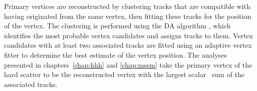 \enlargethispage{\baselineskip}
Primary vertices are reconstructed by clustering
tracks that are compatible with having originated from the same vertex, then fitting 
these tracks for the position of the vertex. The clustering 
is performed using the \ac{DA} algorithm \cite{vtx-da}, which identifies
the most probable vertex candidates and assigns tracks to them. Vertex
candidates with at least two associated tracks are fitted using an adaptive
vertex fitter \cite{vtx-adaptivefit} to determine the best estimate of the 
vertex position. The analyses presented in chapters~\ref{chap:hhh} and \ref{chap:mssm} take the primary
vertex of the hard scatter to be the reconstructed vertex with the largest scalar \pT~sum of the associated
tracks. %

